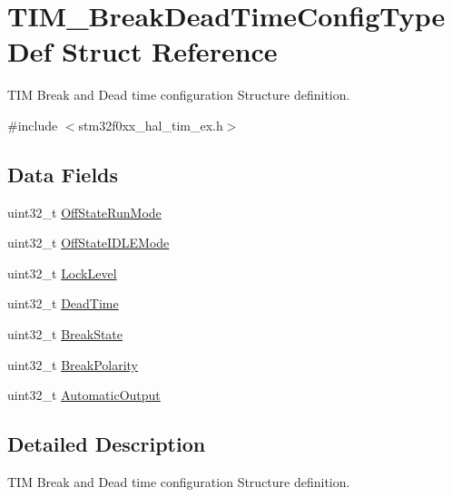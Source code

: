 \hypertarget{struct_t_i_m___break_dead_time_config_type_def}{}\section{T\+I\+M\+\_\+\+Break\+Dead\+Time\+Config\+Type\+Def Struct Reference}
\label{struct_t_i_m___break_dead_time_config_type_def}


T\+IM Break and Dead time configuration Structure definition.  




{\ttfamily \#include $<$stm32f0xx\+\_\+hal\+\_\+tim\+\_\+ex.\+h$>$}

\subsection*{Data Fields}
\begin{DoxyCompactItemize}
\item 
uint32\+\_\+t \hyperlink{struct_t_i_m___break_dead_time_config_type_def_af45695121f3b3fe1ab24e8fbdb56d781}{Off\+State\+Run\+Mode}
\item 
uint32\+\_\+t \hyperlink{struct_t_i_m___break_dead_time_config_type_def_a24f5a355f44432458801392e40a80faa}{Off\+State\+I\+D\+L\+E\+Mode}
\item 
uint32\+\_\+t \hyperlink{struct_t_i_m___break_dead_time_config_type_def_a5fb4b2ca5382b21df284a2d0ce75d32c}{Lock\+Level}
\item 
uint32\+\_\+t \hyperlink{struct_t_i_m___break_dead_time_config_type_def_a5a08cf07668e90bc708f8cccf709f2b4}{Dead\+Time}
\item 
uint32\+\_\+t \hyperlink{struct_t_i_m___break_dead_time_config_type_def_a2a1604bd7f46bd571a2507c5f873474f}{Break\+State}
\item 
uint32\+\_\+t \hyperlink{struct_t_i_m___break_dead_time_config_type_def_a9ac85dcd5135063196b8954d9b779aa7}{Break\+Polarity}
\item 
uint32\+\_\+t \hyperlink{struct_t_i_m___break_dead_time_config_type_def_a811ab6cfce79a2aadab7fc040413c037}{Automatic\+Output}
\end{DoxyCompactItemize}


\subsection{Detailed Description}
T\+IM Break and Dead time configuration Structure definition. 

